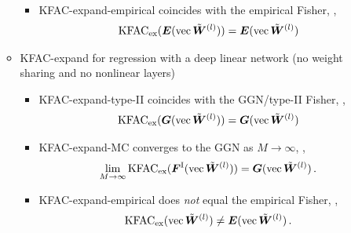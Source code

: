 \begin{itemize}
\begin{itemize}
\begin{itemize}
\begin{align*}
            \end{align*}
          \item KFAC-expand-empirical coincides with the empirical Fisher, \ie,
            \begin{align*}
              \mathrm{KFAC}_{\text{ex}}({\bm{E}}(\operatorname{vec}\tilde{{\bm{W}}}^{(l)})) = {\bm{E}}(\operatorname{vec} \tilde{{\bm{W}}}^{(l)})
            \end{align*}
        \end{itemize}
      \item KFAC-expand for regression with a deep linear network (no weight sharing and no nonlinear layers)
        \begin{itemize}
          \item KFAC-expand-type-II coincides with the GGN/type-II Fisher, \ie,
            \begin{align*}
              \mathrm{KFAC}_{\text{ex}}({\bm{G}}(\operatorname{vec} \tilde{{\bm{W}}}^{(l)})) = {\bm{G}}(\operatorname{vec} \tilde{{\bm{W}}}^{(l)})
            \end{align*}
          \item KFAC-expand-MC converges to the GGN as $M\rightarrow\infty$, \ie,
            \begin{align*}
              \lim_{M \to \infty} \mathrm{KFAC}_{\text{ex}}({\bm{F}}^{\text{I}}(\operatorname{vec} \tilde{{\bm{W}}}^{(l)})) = {\bm{G}}(\operatorname{vec} \tilde{{\bm{W}}}^{(l)})\,.
            \end{align*}
          \item KFAC-expand-empirical does \emph{not} equal the empirical Fisher, \ie,
            \begin{align*}
              \mathrm{KFAC}_{\text{ex}}(\operatorname{vec} \tilde{{\bm{W}}}^{(l)})
              \neq
              {\bm{E}}(\operatorname{vec} \tilde{{\bm{W}}}^{(l)})\,.
            \end{align*}
        \end{itemize}
      \end{itemize}
    \end{itemize}
